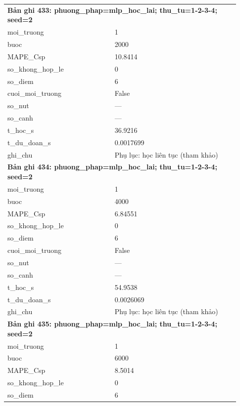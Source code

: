 \begin{longtable}{p{0.43\linewidth}p{0.50\linewidth}}
\midrule
\multicolumn{2}{p{0.95\linewidth}}{\textbf{Bản ghi 433: phuong\_phap=mlp\_hoc\_lai; thu\_tu=1-2-3-4; seed=2}} \\
moi\_\allowbreak truong & 1 \\
buoc & 2000 \\
MAPE\_\allowbreak Csp & 10.8414 \\
so\_\allowbreak khong\_\allowbreak hop\_\allowbreak le & 0 \\
so\_\allowbreak diem & 6 \\
cuoi\_\allowbreak moi\_\allowbreak truong & False \\
so\_\allowbreak nut & — \\
so\_\allowbreak canh & — \\
t\_\allowbreak hoc\_\allowbreak s & 36.9216 \\
t\_\allowbreak du\_\allowbreak doan\_\allowbreak s & 0.0017699 \\
ghi\_\allowbreak chu & Phụ lục: học liên tục (tham khảo) \\
\midrule
\multicolumn{2}{p{0.95\linewidth}}{\textbf{Bản ghi 434: phuong\_phap=mlp\_hoc\_lai; thu\_tu=1-2-3-4; seed=2}} \\
moi\_\allowbreak truong & 1 \\
buoc & 4000 \\
MAPE\_\allowbreak Csp & 6.84551 \\
so\_\allowbreak khong\_\allowbreak hop\_\allowbreak le & 0 \\
so\_\allowbreak diem & 6 \\
cuoi\_\allowbreak moi\_\allowbreak truong & False \\
so\_\allowbreak nut & — \\
so\_\allowbreak canh & — \\
t\_\allowbreak hoc\_\allowbreak s & 54.9538 \\
t\_\allowbreak du\_\allowbreak doan\_\allowbreak s & 0.0026069 \\
ghi\_\allowbreak chu & Phụ lục: học liên tục (tham khảo) \\
\midrule
\multicolumn{2}{p{0.95\linewidth}}{\textbf{Bản ghi 435: phuong\_phap=mlp\_hoc\_lai; thu\_tu=1-2-3-4; seed=2}} \\
moi\_\allowbreak truong & 1 \\
buoc & 6000 \\
MAPE\_\allowbreak Csp & 8.5014 \\
so\_\allowbreak khong\_\allowbreak hop\_\allowbreak le & 0 \\
so\_\allowbreak diem & 6 \\

\end{longtable}
